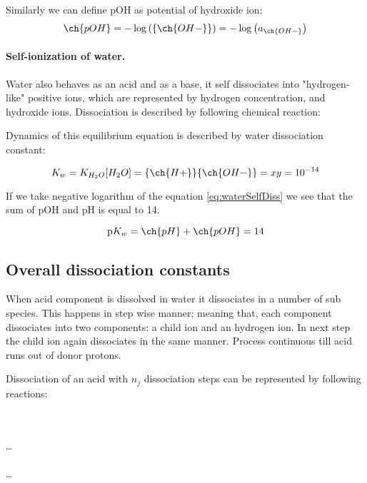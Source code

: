\noindent
Similarly we can define pOH as potential of hydroxide ion:
\begin{equation}\label{eq:pohDef}
    \ch{pOH} = -\log \left(\left\{\ch{OH-}\right\}\right) = -\log\left(a_{\ch{OH-}}\right)
\end{equation}

\paragraph*{Self-ionization of water.} Water also behaves as an acid and as a base, it self dissociates
into "hydrogen-like" positive ions, which are represented by hydrogen concentration, and hydroxide ions.
Dissociation is described by following chemical reaction:


Dynamics of this equilibrium equation is described by water dissociation constant:

\begin{equation}\label{eq:waterSelfDiss}
    K_w = K_{H_2O}[H_2O] = \{\ch{H+}\}\{\ch{OH-}\} = xy = 10^{-14}
\end{equation}

If we take negative logarithm of the equation \ref{eq:waterSelfDiss} we see that the sum of pOH and pH is equal to 14.

\begin{equation}\label{eq:phPoh}
    \text{p}K_w = \ch{pH} + \ch{pOH} = 14
\end{equation}


\subsection{Overall dissociation constants}

When acid component is dissolved in water it dissociates in a number of sub species. This happens
in step wise manner; meaning that, each component dissociates into two components: a child ion and an hydrogen ion.
In next step the child ion again dissociates in the same manner. Process continuous till acid runs out
of donor protons.

Dissociation of an acid with $n_j$ dissociation steps can be represented by following reactions:

\vspace{0.3cm}
\begin{center}
    \noindent
     \\
     \\
    \dots \\
     \\
    \dots \\
\end{center}
\vspace{0.5cm}

